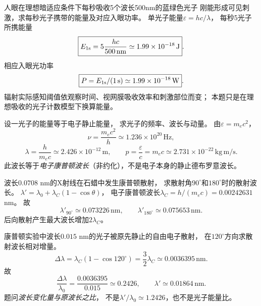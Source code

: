 \problemtext 人眼在理想暗适应条件下每秒吸收5个波长500nm的蓝绿色光子
刚能形成可见刺激，求每秒光子携带的能量及对应入眼功率。
\workings
单光子能量$\varepsilon=hc/\lambda$，
每秒5光子所携能量
\[
\boxed{E_{\rm 1s}=5\frac{hc}{500\,\mathrm{nm}}
\simeq1.99\times10^{-18}\,\mathrm J}.
\]
相应入眼光功率
\[
\boxed{P=E_{\rm 1s}/(1\,\mathrm s)
\simeq1.99\times10^{-18}\,\mathrm W}.
\]
\crosscheck 辐射实际感知阈值依观察时间、视网膜吸收效率和刺激部位而变；
本题只是在理想吸收的光子计数模型下换算能量。

\problemtext 设一光子的能量等于电子静止能量，
求光子的频率、波长与动量。
\workings
由$\varepsilon=m_ec^2$，
\[
\boxed{\nu=\frac{m_ec^2}{h}
\simeq1.236\times10^{20}\,\mathrm{Hz}},
\]
\[
\boxed{\lambda=\frac{h}{m_ec}
\simeq2.426\times10^{-12}\,\mathrm m},\qquad
\boxed{p=\frac{\varepsilon}{c}=m_ec
\simeq2.731\times10^{-22}\,\mathrm{kg\,m/s}}.
\]
\crosscheck 此波长等于\emph{电子康普顿波长}（非约化），不是电子本身的静止德布罗意波长。

\problemtext 波长$0.0708$ nm的X射线在石蜡中发生康普顿散射，
求散射角$90^\circ$和$180^\circ$时的散射波长。
\workings
$\lambda'=\lambda_0+\lambda_C(1-\cos\theta)$，
电子康普顿波长$\lambda_C=h/(m_ec)=0.00242631$ nm。
故
\[
\boxed{\lambda'_{90^\circ}\simeq0.073226\,\mathrm{nm}},
\qquad
\boxed{\lambda'_{180^\circ}\simeq0.075653\,\mathrm{nm}}.
\]
\crosscheck 后向散射产生最大波长增加$2\lambda_C$。

\problemtext 康普顿实验中波长$0.015$ nm的光子被原先静止的自由电子散射，
在$120^\circ$方向求散射波长相对增量。
\workings
\[
\Delta\lambda=\lambda_C(1-\cos120^\circ)
=\frac32\lambda_C\simeq0.0036395\,\mathrm{nm}.
\]
故
\[
\boxed{\frac{\Delta\lambda}{\lambda_0}
=\frac{0.0036395}{0.015}\simeq0.2426},
\qquad
\boxed{\lambda'\simeq0.01864\,\mathrm{nm}}.
\]
\crosscheck 题问\emph{波长变化量与原波长之比}，
不是$\lambda'/\lambda_0\simeq1.2426$，也不是光子能量比。
